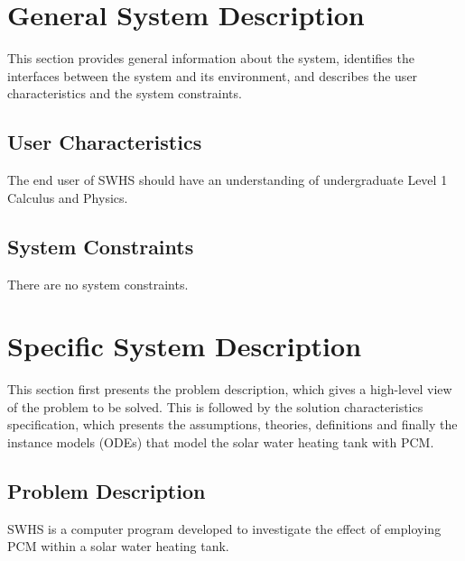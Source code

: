\documentclass[12pt]{article}
\newcommand{\progname}{SWHS}
\begin{document}

\section{General System Description}

This section provides general information about the system,
identifies the interfaces between the system and its environment, and describes the
user characteristics and the system constraints.


\subsection{User Characteristics}

The end user of \progname{} should have an understanding of undergraduate Level
1 Calculus and Physics.

\subsection{System Constraints}

There are no system constraints.

\section{Specific System Description}

This section first presents the problem description, which gives a high-level
view of the problem to be solved.  This is followed by the solution characteristics
specification, which presents the assumptions, theories, definitions and finally
the instance models (ODEs) that model the solar water heating tank with PCM.

\subsection{Problem Description} \label{Sec_pd}

\progname{} is a computer program developed to investigate the effect of
employing PCM within a solar water heating tank.
\end{document}
